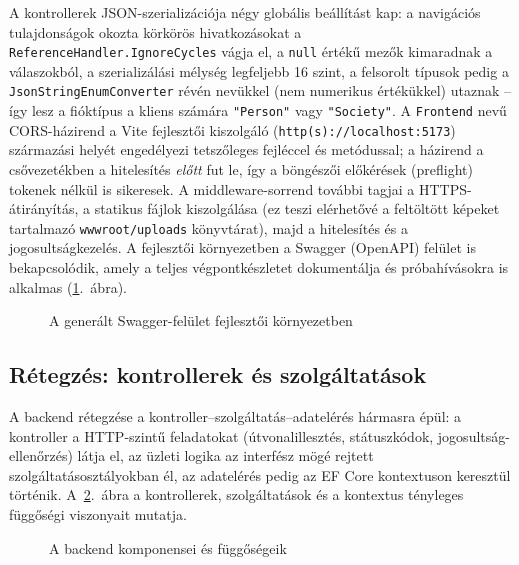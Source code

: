 A kontrollerek JSON-szerializációja négy globális beállítást kap: a navigációs tulajdonságok
okozta körkörös hivatkozásokat a \texttt{ReferenceHandler.IgnoreCycles} vágja el, a \texttt{null}
értékű mezők kimaradnak a válaszokból, a szerializálási mélység legfeljebb 16 szint, a felsorolt
típusok pedig a \texttt{JsonStringEnumConverter} révén nevükkel (nem numerikus értékükkel)
utaznak -- így lesz a fióktípus a kliens számára \texttt{"Person"} vagy \texttt{"Society"}. A
\texttt{Frontend} nevű CORS-házirend a Vite fejlesztői kiszolgáló
(\texttt{http(s)://localhost:5173}) származási helyét engedélyezi tetszőleges fejléccel és
metódussal; a házirend a csővezetékben a hitelesítés \emph{előtt} fut le, így a böngészői
előkérések (preflight) tokenek nélkül is sikeresek. A middleware-sorrend további tagjai a
HTTPS-átirányítás, a statikus fájlok kiszolgálása (ez teszi elérhetővé a feltöltött képeket
tartalmazó \texttt{wwwroot/uploads} könyvtárat), majd a hitelesítés és a jogosultságkezelés. A
fejlesztői környezetben a Swagger (OpenAPI) felület is bekapcsolódik, amely a teljes
végpontkészletet dokumentálja és próbahívásokra is alkalmas
(\ref{fig:swagger}.~ábra).

\begin{figure}[htbp]
	\centering
	\caption{A generált Swagger-felület fejlesztői környezetben}
	\label{fig:swagger}
\end{figure}

\subsection{Rétegzés: kontrollerek és szolgáltatások}

A backend rétegzése a kontroller--szolgáltatás--adatelérés hármasra épül: a kontroller a
HTTP-szintű feladatokat (útvonalillesztés, státuszkódok, jogosultság-ellenőrzés) látja el, az
üzleti logika az interfész mögé rejtett szolgáltatásosztályokban él, az adatelérés pedig az EF
Core kontextuson keresztül történik. A~\ref{fig:komponens}.~ábra a kontrollerek, szolgáltatások
és a kontextus tényleges függőségi viszonyait mutatja.

\begin{figure}[htbp]
	\centering
	\caption{A backend komponensei és függőségeik}
	\label{fig:komponens}
\end{figure}

